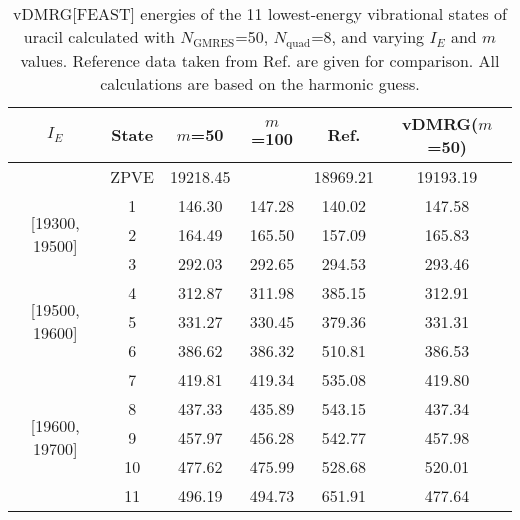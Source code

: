 \documentclass[journal=jctcce]{achemso}
\begin{document}
\begin{table}
  \begin{tabular}{cc|cc|cc}
	\hline \hline
	$I_E$  &  State  &      $m$=50         &      $m$=100         &  Ref. \citenum{Carrington2018_Uracil} & vDMRG($m$=50) \\
	\hline
	  [19200, 19300]
	       &   ZPVE  &    19218.45         &                      &        18969.21                   &     19193.19  \\
	\hline
	\multirow{3}{*}{[19300, 19500]}
	       &    1    &       146.30        &       147.28         &          140.02                   &      147.58   \\
	       &    2    &       164.49        &       165.50         &          157.09                   &      165.83   \\
	       &    3    &       292.03        &       292.65         &          294.53                   &      293.46   \\
	\hline
	\multirow{3}{*}{[19500, 19600]}
  	      &     4    &       312.87        &       311.98         &          385.15                   &      312.91   \\
	      &     5    &       331.27        &       330.45         &          379.36                   &      331.31   \\
	      &     6    &       386.62        &       386.32         &          510.81                   &      386.53   \\
	\hline
	\multirow{5}{*}{[19600, 19700]}
 	      &     7    &       419.81        &       419.34         &          535.08                   &      419.80  \\
	      &     8    &       437.33        &       435.89         &          543.15                   &      437.34  \\
	      &     9    &       457.97        &       456.28         &          542.77                   &      457.98  \\
	      &    10    &       477.62        &       475.99         &          528.68                   &      520.01  \\
	      &    11    &       496.19        &       494.73         &          651.91                   &      477.64  \\
	\hline
 	\hline
  \end{tabular}
  \caption{vDMRG[FEAST] energies of the 11 lowest-energy vibrational states of uracil calculated with $N_\text{GMRES}$=50, $N_\text{quad}$=8, and varying $I_E$ and $m$ values.
Reference data taken from  Ref.  are given for comparison.
  All calculations are based on the harmonic guess.}
  \label{tab:Uracil_ExcitedStates}
\end{table}
\end{document}
